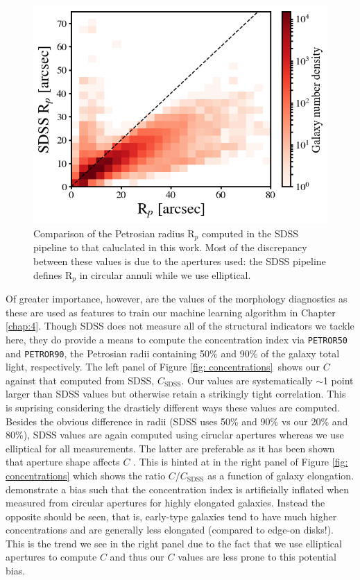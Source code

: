 \begin{figure}
\centering
\includegraphics[width=5in]{Figures/PetroRad_compare_cleanSample_forThesis.png}
\caption[Comparison of Petrosian radius from this work to that computed in SDSS pipeline]{Comparison of the Petrosian radius R$_p$ computed in the SDSS pipeline to that caluclated in this work. Most of the discrepancy between these values is due to the apertures used: the SDSS pipeline defines R$_p$ in circular annuli while we use elliptical.}
\label{fig: Rp comparison}
\end{figure}

Of greater importance, however, are the values of the morphology diagnostics as these are used as features to train our machine learning algorithm in Chapter \ref{chap:4}. Though SDSS does not measure all of the structural indicators we tackle here, they do provide a means to compute the concentration index via \texttt{PETROR50} and \texttt{PETROR90}, the Petrosian radii containing 50\% and 90\% of the galaxy total light, respectively. The left panel of Figure \ref{fig: concentrations}~shows our $C$ against that computed from SDSS, $C_{\mathrm{SDSS}}$. Our values are systematically $\sim$1 point larger than SDSS values but otherwise retain a strikingly tight correlation. This is suprising considering the drasticly different ways these values are computed. Besides the obvious difference in radii (SDSS uses 50\% and 90\% vs our 20\% and 80\%), SDSS values are again computed using ciruclar apertures whereas we use elliptical for all measurements. The latter are preferable as it has been shown that aperture shape affects $C$ \citep{Bershady2000, Andrae2011}. This is hinted at in the right panel of Figure \ref{fig: concentrations} which shows the ratio $C$/$C_{\mathrm{SDSS}}$ as a function of galaxy elongation. \cite{Andrae2011} demonstrate a bias such that the concentration index is artificially inflated when measured from circular apertures for highly elongated galaxies. Instead the opposite should be seen, that is, early-type galaxies tend to have much higher concentrations and are generally less elongated (compared to edge-on disks!). This is the trend we see in the right panel due to the fact that we use elliptical apertures to compute $C$ and thus our $C$ values are less prone to this potential bias.


